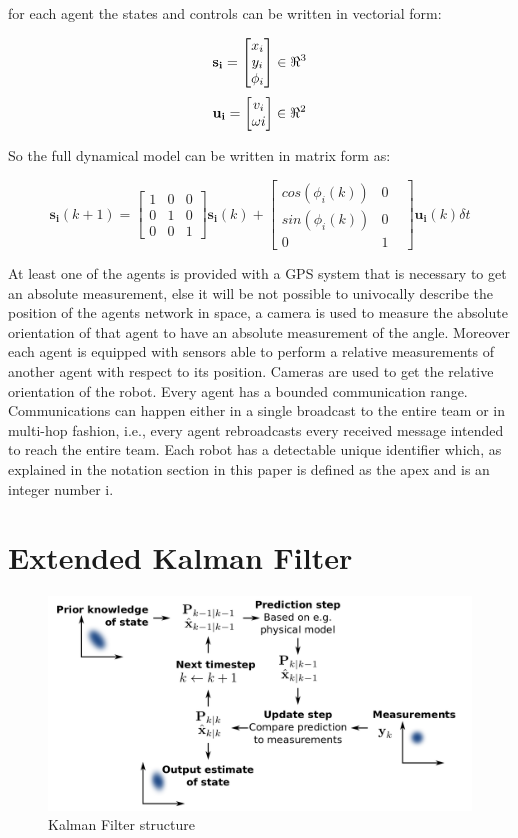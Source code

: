 \documentclass[conference]{IEEEtran}
\begin{document}
for each agent the states and controls can be written in vectorial form:

$$ \mathbf{s_{i}} =  \begin{bmatrix} x_{i}\\ y_{i} \\ \phi_{i}  \end{bmatrix}\in \real^{3} $$
$$ \mathbf{u_{i}} =  \begin{bmatrix} v_{i}\\ \omega{i}  \end{bmatrix} \in \real^{2}$$


So the full dynamical model can be written in matrix form as:


$$ \mathbf{s_{i}}(k+1)  = \begin{bmatrix}1 & 0 & 0 \\ 0  & 1 & 0\\ 0&0&1 \end{bmatrix}
\mathbf{s_{i}}(k)+\begin{bmatrix}cos(\phi_{i}(k)) & 0  \\ sin(\phi_{i}(k)) & 0\\ 0&1& \end{bmatrix}\mathbf{u_{i}}(k) \delta t$$


At least one of the agents is provided with a GPS system that is necessary to get an absolute measurement, else it will be not possible to univocally describe the position of the agents network in space, a camera is used to measure the absolute orientation of that agent to have an absolute measurement of the angle.
Moreover each agent is equipped with sensors able to perform a relative measurements of another agent with respect to its position. Cameras are used to get the relative orientation of the robot.
Every agent has a bounded communication range. Communications can happen either in a single broadcast to the entire team or in multi-hop fashion, i.e., every agent rebroadcasts every received message intended to reach the entire team. Each robot has
a detectable unique identifier which, as explained in the notation section in this paper is defined as the apex and is an integer number i.


\section{Extended Kalman Filter}


\begin{figure}[H]
 \includegraphics[width=\linewidth]{dwg/kalman.png}
  \caption{Kalman Filter structure} 
\end{figure}
\end{document}
